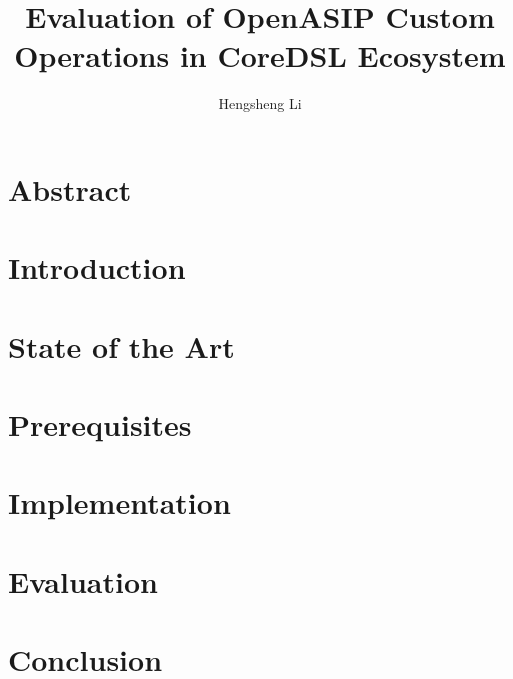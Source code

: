 \documentclass[
  a4paper,            %
  thesis=student,     %
  english,            %
  coverpage=false,    %
  titlepage=false,    %
  oneside,            %
  font=times          %
]{tumbook}
\title{Evaluation of OpenASIP Custom Operations in CoreDSL Ecosystem}
\subtitle{}
\author{Hengsheng Li}
\begin{document}
\frontmatter
\maketitle
\chapter{Abstract}

\tableofcontents

\mainmatter
\chapter{Introduction}


\chapter{State of the Art}


\chapter{Prerequisites}


\chapter{Implementation}


\chapter{Evaluation}


\chapter{Conclusion}


\backmatter


\end{document}
